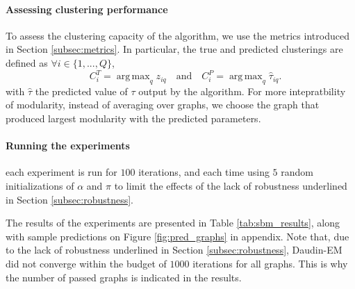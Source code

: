 \documentclass[switch, 12pt]{article}
\newcommand{\J}{\mathcal{J}}
\DeclareMathOperator*{\argmax}{arg\,max}
\newcommand{\intset}[2]{\{#1, ..., #2\}}
\begin{document}
\begin{multicols}{2}

    \paragraph{Assessing clustering performance} To assess the clustering capacity of the algorithm, we use the metrics introduced in Section \ref{subsec:metrics}. In particular, the true and predicted clusterings are defined as $\forall i \in \intset{1}{Q}$,
    \begin{equation}
        \quad C^T_i = \argmax_q z_{iq} \quad \text{and} \quad C^P_i = \argmax_q \hat{\tau}_{iq}.
    \end{equation}
    with $\hat{\tau}$ the predicted value of $\tau$ output by the algorithm. For more intepratbility of modularity, instead of averaging over graphs, we choose the graph that produced largest modularity with the predicted parameters.

    \paragraph{Running the experiments} each experiment is run for $100$ iterations, and each time using $5$ random initializations of $\alpha$ and $\pi$ to limit the effects of the lack of robustness underlined in Section \ref{subsec:robustness}.

    The results of the experiments are presented in Table \ref{tab:sbm_results}, along with sample predictions on Figure \ref{fig:pred_graphs} in appendix. Note that, due to the lack of robustness underlined in Section \ref{subsec:robustness}, Daudin-EM did not converge within the budget of $1000$ iterations for all graphs. This is why the number of passed graphs is indicated in the results.



\end{multicols}
\end{document}
